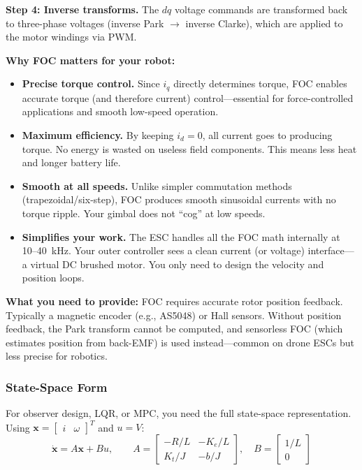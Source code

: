\begin{mdframed}[linewidth=1pt, innertopmargin=10pt, innerbottommargin=10pt]
\textbf{Step 4: Inverse transforms.} The $dq$ voltage commands are transformed back to three-phase voltages (inverse Park $\to$ inverse Clarke), which are applied to the motor windings via PWM.

\textbf{Why FOC matters for your robot:}
\begin{itemize}[nosep]
    \item \textbf{Precise torque control.} Since $i_q$ directly determines torque, FOC enables accurate torque (and therefore current) control---essential for force-controlled applications and smooth low-speed operation.
    \item \textbf{Maximum efficiency.} By keeping $i_d = 0$, all current goes to producing torque. No energy is wasted on useless field components. This means less heat and longer battery life.
    \item \textbf{Smooth at all speeds.} Unlike simpler commutation methods (trapezoidal/six-step), FOC produces smooth sinusoidal currents with no torque ripple. Your gimbal does not ``cog'' at low speeds.
    \item \textbf{Simplifies your work.} The ESC handles all the FOC math internally at 10--40~kHz. Your outer controller sees a clean current (or voltage) interface---a virtual DC brushed motor. You only need to design the velocity and position loops.
\end{itemize}

\textbf{What you need to provide:} FOC requires accurate rotor position feedback. Typically a magnetic encoder (e.g., AS5048) or Hall sensors. Without position feedback, the Park transform cannot be computed, and sensorless FOC (which estimates position from back-EMF) is used instead---common on drone ESCs but less precise for robotics.
\end{mdframed}

\subsubsection*{State-Space Form}

For observer design, LQR, or MPC, you need the full state-space representation. Using $\mathbf{x} = \begin{bmatrix} i & \omega \end{bmatrix}^T$ and $u = V$:
\begin{equation}
\dot{\mathbf{x}} = A\mathbf{x} + Bu, \qquad
A = \begin{bmatrix} -R/L & -K_e/L \\ K_t/J & -b/J \end{bmatrix}, \quad
B = \begin{bmatrix} 1/L \\ 0 \end{bmatrix}
\end{equation}


